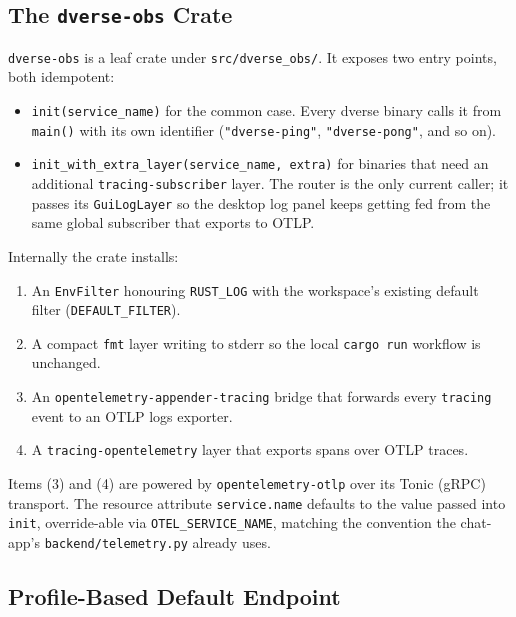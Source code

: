 \documentclass[11pt,a4paper]{article}
\begin{document}
\subsection{The \texttt{dverse-obs} Crate}

\texttt{dverse-obs} is a leaf crate under \texttt{src/dverse\_obs/}.
It exposes two entry points, both idempotent:

\begin{itemize}
  \item \texttt{init(service\_name)} for the common case. Every
        dverse binary calls it from \texttt{main()} with its own
        identifier (\texttt{"dverse-ping"}, \texttt{"dverse-pong"},
        and so on).
  \item \texttt{init\_with\_extra\_layer(service\_name, extra)}
        for binaries that need an additional
        \texttt{tracing-subscriber} layer. The router is the
        only current caller; it passes its
        \texttt{GuiLogLayer} so the desktop log panel keeps
        getting fed from the same global subscriber that exports
        to OTLP.
\end{itemize}

Internally the crate installs:

\begin{enumerate}
  \item An \texttt{EnvFilter} honouring \texttt{RUST\_LOG} with
        the workspace's existing default filter
        (\texttt{DEFAULT\_FILTER}).
  \item A compact \texttt{fmt} layer writing to stderr so the
        local \texttt{cargo run} workflow is unchanged.
  \item An \texttt{opentelemetry-appender-tracing} bridge that
        forwards every \texttt{tracing} event to an OTLP logs
        exporter.
  \item A \texttt{tracing-opentelemetry} layer that exports
        spans over OTLP traces.
\end{enumerate}

Items (3) and (4) are powered by
\texttt{opentelemetry-otlp} over its Tonic (gRPC)
transport. The resource attribute \texttt{service.name} defaults
to the value passed into \texttt{init}, override-able via
\texttt{OTEL\_SERVICE\_NAME}, matching the convention the
chat-app's \texttt{backend/telemetry.py} already uses.

\subsection{Profile-Based Default Endpoint}
\end{document}
